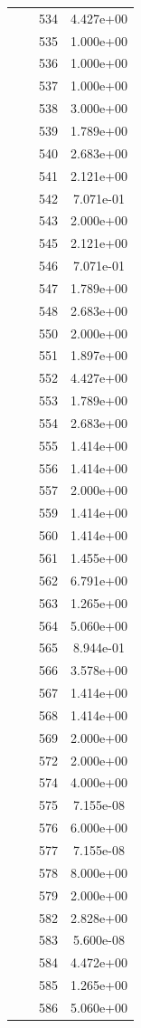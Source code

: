 \documentclass[12pt]{article}
\begin{document}
\begin{longtable}{@{}cccc@{}}
 &  & 534 & 4.427e+00 \\
 &  & 535 & 1.000e+00 \\
 &  & 536 & 1.000e+00 \\
 &  & 537 & 1.000e+00 \\
 &  & 538 & 3.000e+00 \\
 &  & 539 & 1.789e+00 \\
 &  & 540 & 2.683e+00 \\
 &  & 541 & 2.121e+00 \\
 &  & 542 & 7.071e-01 \\
 &  & 543 & 2.000e+00 \\
 &  & 545 & 2.121e+00 \\
 &  & 546 & 7.071e-01 \\
 &  & 547 & 1.789e+00 \\
 &  & 548 & 2.683e+00 \\
 &  & 550 & 2.000e+00 \\
 &  & 551 & 1.897e+00 \\
 &  & 552 & 4.427e+00 \\
 &  & 553 & 1.789e+00 \\
 &  & 554 & 2.683e+00 \\
 &  & 555 & 1.414e+00 \\
 &  & 556 & 1.414e+00 \\
 &  & 557 & 2.000e+00 \\
 &  & 559 & 1.414e+00 \\
 &  & 560 & 1.414e+00 \\
 &  & 561 & 1.455e+00 \\
 &  & 562 & 6.791e+00 \\
 &  & 563 & 1.265e+00 \\
 &  & 564 & 5.060e+00 \\
 &  & 565 & 8.944e-01 \\
 &  & 566 & 3.578e+00 \\
 &  & 567 & 1.414e+00 \\
 &  & 568 & 1.414e+00 \\
 &  & 569 & 2.000e+00 \\
 &  & 572 & 2.000e+00 \\
 &  & 574 & 4.000e+00 \\
 &  & 575 & 7.155e-08 \\
 &  & 576 & 6.000e+00 \\
 &  & 577 & 7.155e-08 \\
 &  & 578 & 8.000e+00 \\
 &  & 579 & 2.000e+00 \\
 &  & 582 & 2.828e+00 \\
 &  & 583 & 5.600e-08 \\
 &  & 584 & 4.472e+00 \\
 &  & 585 & 1.265e+00 \\
 &  & 586 & 5.060e+00 \\

\bottomrule
\end{longtable}
\end{document}
